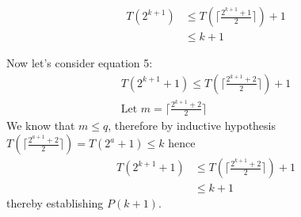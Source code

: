 \documentclass[10pt]{exam}
\begin{document}
\begin{parts}
\begin{customsolutionbox}
        \begin{align}
            T(2^{k+1}) &\leq T(\lceil\frac{2^{k+1}+1}{2}\rceil) + 1 \\
                   &\leq k + 1
        \end{align}

        Now let's consider equation 5:
        \begin{align}
            T(2^{k+1} + 1) \leq T(\lceil\frac{2^{k+1}+2}{2}\rceil) + 1 \\
            \text{Let } m = \lceil\frac{2^{k+1}+2}{2}\rceil
        \end{align}
        We know that $m \leq q$, therefore by inductive hypothesis $T(\lceil\frac{2^{a+1}+2}{2}\rceil) = T(2^{a}+1) \leq k$ hence
        \begin{align}
            T(2^{k+1} + 1) &\leq T(\lceil\frac{2^{k+1}+2}{2}\rceil) + 1 \\
                            &\leq k + 1
        \end{align}
        thereby establishing $P(k+1)$.
    \end{customsolutionbox}
\end{parts}
\end{document}
